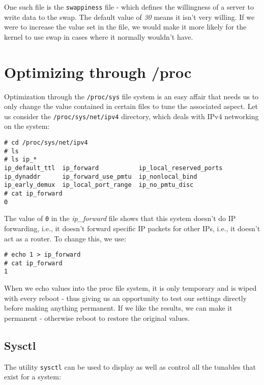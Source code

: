 \noindent
One such file is the \verb|swappiness| file - which defines the willingness of a server to write data to the swap. The default value of \textit{30} means it isn't very willing. If we were to increase the value set in the file, we would make it more likely for the kernel to use swap in cases where it normally wouldn't have. 

\section{Optimizing through /proc}
Optimization through the \verb|/proc/sys| file system is an easy affair that needs us to only change the value contained in certain files to tune the associated aspect. Let us consider the \verb|/proc/sys/net/ipv4| directory, which deals with IPv4 networking on the system:

\vspace{-15pt}
\begin{verbatim}
# cd /proc/sys/net/ipv4
# ls
# ls ip_*
ip_default_ttl  ip_forward           ip_local_reserved_ports
ip_dynaddr      ip_forward_use_pmtu  ip_nonlocal_bind
ip_early_demux  ip_local_port_range  ip_no_pmtu_disc
# cat ip_forward
0
\end{verbatim}
\vspace{-10pt}	

\noindent
The value of \verb|0| in the \textit{ip\_forward} file shows that this system doesn't do IP forwarding, i.e., it doesn't forward specific IP packets for other IPs, i.e., it doesn't act as a router. To change this, we use:

\vspace{-15pt}
\begin{verbatim}
# echo 1 > ip_forward
# cat ip_forward
1
\end{verbatim}
\vspace{-10pt}	

\noindent
When we echo values into the proc file system, it is only temporary and is wiped with every reboot - thus giving us an opportunity to test our settings directly before making anything permanent. If we like the results, we can make it permanent - otherwise reboot to restore the original values. 

\subsection{Sysctl}
The utility \verb|sysctl| can be used to display as well as control all the tunables that exist for a system:

